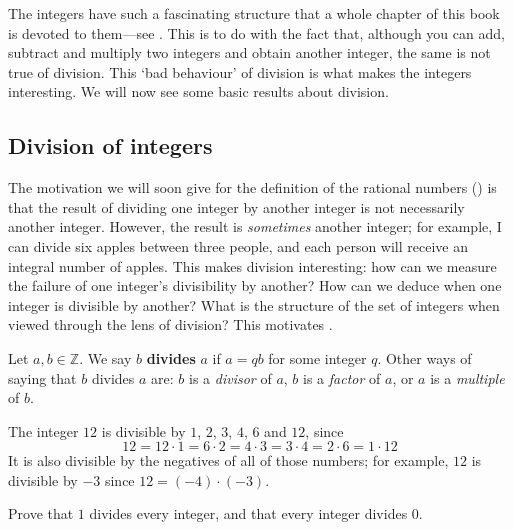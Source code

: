 The integers have such a fascinating structure that a whole chapter of this book is devoted to them---see . This is to do with the fact that, although you can add, subtract and multiply two integers and obtain another integer, the same is not true of division. This `bad behaviour' of division is what makes the integers interesting. We will now see some basic results about division.

\subsection*{Division of integers}
\label{pGettingStartedDivision}

The motivation we will soon give for the definition of the rational numbers () is that the result of dividing one integer by another integer is not necessarily another integer. However, the result is \textit{sometimes} another integer; for example, I can divide six apples between three people, and each person will receive an integral number of apples. This makes division interesting: how can we measure the failure of one integer's divisibility by another? How can we deduce when one integer is divisible by another? What is the structure of the set of integers when viewed through the lens of division? This motivates .

\begin{definition}
\label{defDivisionPreliminary}
Let $a,b \in \mathbb{Z}$. We say $b$ \textbf{divides} $a$ if $a=qb$ for some integer $q$. Other ways of saying that $b$ divides $a$ are: $b$ is a \textit{divisor} of $a$, $b$ is a \textit{factor} of $a$, or $a$ is a \textit{multiple} of $b$.
\end{definition}

\begin{example}
The integer $12$ is divisible by $1$, $2$, $3$, $4$, $6$ and $12$, since
\[ 12 = 12 \cdot 1 = 6 \cdot 2 = 4 \cdot 3 = 3 \cdot 4 = 2 \cdot 6 = 1 \cdot 12 \]
It is also divisible by the negatives of all of those numbers; for example, $12$ is divisible by $-3$ since $12 = (-4) \cdot (-3)$.
\end{example}

\begin{exercise}
Prove that $1$ divides every integer, and that every integer divides $0$.
\end{exercise}

